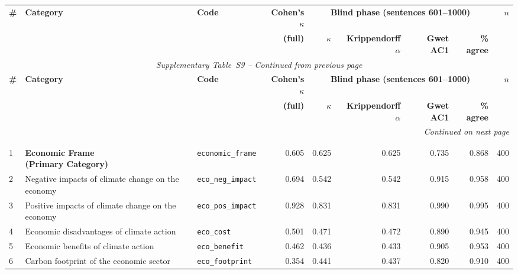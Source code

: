 \label{tab:per_category_reliability}
\begin{longtable}{p{0.5cm}p{4.4cm}p{3.0cm}rrrrrr}
\toprule
\multirow{2}{*}{\textbf{\#}} & \multirow{2}{*}{\textbf{Category}} & \multirow{2}{*}{\textbf{Code}} & \textbf{Cohen's $\kappa$} & \multicolumn{4}{c}{\textbf{Blind phase (sentences 601--1000)}} & \multirow{2}{*}{\textbf{$n$}} \\
\cmidrule(lr){5-8}
& & & \textbf{(full)} & \textbf{$\kappa$} & \textbf{Krippendorff $\alpha$} & \textbf{Gwet AC1} & \textbf{\% agree} & \\
\midrule
\endfirsthead
\multicolumn{9}{c}{\textit{Supplementary Table~S9 -- Continued from previous page}} \\
\toprule
\multirow{2}{*}{\textbf{\#}} & \multirow{2}{*}{\textbf{Category}} & \multirow{2}{*}{\textbf{Code}} & \textbf{Cohen's $\kappa$} & \multicolumn{4}{c}{\textbf{Blind phase (sentences 601--1000)}} & \multirow{2}{*}{\textbf{$n$}} \\
\cmidrule(lr){5-8}
& & & \textbf{(full)} & \textbf{$\kappa$} & \textbf{Krippendorff $\alpha$} & \textbf{Gwet AC1} & \textbf{\% agree} & \\
\midrule
\endhead
\midrule
\multicolumn{9}{r}{\textit{Continued on next page}} \\
\endfoot
\bottomrule
\endlastfoot
\multicolumn{9}{l}{\cellcolor{gray!10}\textbf{MAIN FRAMES}} \\
\midrule
\rowcolor{gray!8}
\multicolumn{9}{l}{\textit{Economic Frame}} \\
\midrule
1 & \textbf{Economic Frame\newline (Primary Category)} & \texttt{economic\_frame} & 0.605 & 0.625 & 0.625 & 0.735 & 0.868 & 400 \\
\cmidrule(lr){1-9}
2 & Negative impacts of climate change on the economy & \texttt{eco\_neg\_impact} & 0.694 & 0.542 & 0.542 & 0.915 & 0.958 & 400 \\
3 & Positive impacts of climate change on the economy & \texttt{eco\_pos\_impact} & 0.928 & 0.831 & 0.831 & 0.990 & 0.995 & 400 \\
4 & Economic disadvantages of climate action & \texttt{eco\_cost} & 0.501 & 0.471 & 0.472 & 0.890 & 0.945 & 400 \\
5 & Economic benefits of climate action & \texttt{eco\_benefit} & 0.462 & 0.436 & 0.433 & 0.905 & 0.953 & 400 \\
6 & Carbon footprint of the economic sector & \texttt{eco\_footprint} & 0.354 & 0.441 & 0.437 & 0.820 & 0.910 & 400 \\

\end{longtable}
